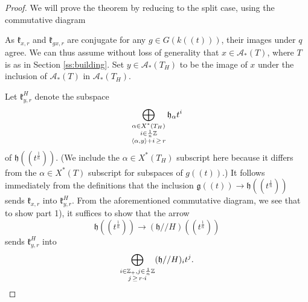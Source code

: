 \documentclass[12pt]{article}
\theoremstyle{remark}
\begin{document}
\begin{proof}
We will prove the theorem by reducing to the split case, using the commutative diagram
\begin{center}
\end{center}
As $\mathfrak{k}_{x,r}$ and $\mathfrak{k}_{gx,r}$ are conjugate for any $g\in G(k((t)))$, their images under $q$ agree. We can thus assume without loss of generality that $x\in\mathcal{A}_*(T)$, where $T$ is as in Section \ref{ss:building}. Set $y\in\mathcal{A}_*(T_H)$ to be the image of $x$ under the inclusion of $\mathcal{A}_*(T)$ in $\mathcal{A}_*(T_H)$.

Let $\mathfrak{k}_{y,r}^H$ denote the subspace
\[
\displaystyle\bigoplus_{\substack{\alpha\in X^*(T_H)\\ i\in\frac{1}{n}\mathbb{Z} \\ \langle\alpha,y\rangle+i\thinspace\geq\thinspace r}}\mathfrak{h}_{\alpha}t^i
\]
of $\mathfrak{h}((t^{\frac{1}{n}})).$ (We include the $\alpha\in X^*(T_H)$ subscript here because it differs from the $\alpha\in X^*(T)$ subscript for subspaces of $g((t))$.) It follows immediately from the definitions that the inclusion $\mathfrak{g}((t))\rightarrow\mathfrak{h}((t^{\frac{1}{n}}))$ sends $\mathfrak{k}_{x,r}$ into $\mathfrak{k}^H_{y,r}$. From the aforementioned commutative diagram, we see that to show part 1), it suffices to show that the arrow
\[
\mathfrak{h}((t^{\frac{1}{n}}))\rightarrow(\mathfrak{h}//H)((t^{\frac{1}{n}}))
\]
sends $\mathfrak{k}^H_{y,r}$ into
\begin{equation}\label{eq:splittarget}
\displaystyle\bigoplus_{\substack{i\in\mathbb{Z}_+,j\in\frac{1}{n}\mathbb{Z}\\ j\thinspace\geq\thinspace r\cdot i}}(\mathfrak{h}//H)_it^j.
\end{equation}


\end{proof}
\end{document}

